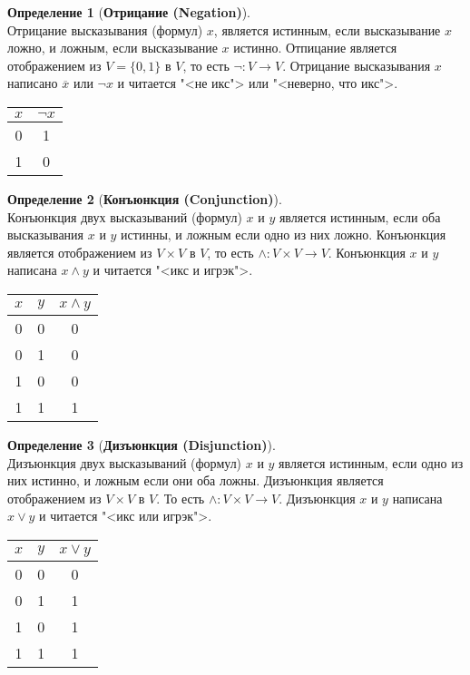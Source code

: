 \documentclass[fleqn,11pt]{article}
\theoremstyle{definition}
\newtheorem{definition}{Определение}
\begin{document}
\begin{definition}[\textbf{Отрицание (Negation)}] ~\\
	Отрицание высказывания (формул) $x$, является истинным, если высказывание $x$ ложно, и ложным, если
	высказывание $x$ истинно. Отпицание является отображением из $V =\{0,1\}$ в $V$, то есть $\neg : V \to V$.
	Отрицание высказывания $x$ написано $\overline{x}$ или $\neg x$ и читается
	"<не икс"> или "<неверно, что икс">.
	\begin{center}
		\begin{tabular}{|c|c|} \hline
			$x$ & $\neg x$ \\ \hline
			0 & 1 \\
			1 & 0 \\
			\hline
		\end{tabular}
	\end{center}
\end{definition}

\begin{definition}[\textbf{Конъюнкция (Conjunction)}] ~\\
	Конъюнкция двух высказываний (формул) $x$ и $y$ является истинным, если оба высказывания $x$ и $y$
	истинны, и ложным если одно из них ложно. Конъюнкция является отображением из $V\times V$ в $V$,
	то есть $\land : V \times V \to V$. Конъюнкция $x$ и $y$ написана $x \land y$ и читается "<икс и игрэк">.
	\begin{center}
		\begin{tabular}{|c|c|c|} \hline
			$x$ & $y$ & $x \land y$  \\ \hline
			0 & 0 & 0 \\
			0 & 1 & 0 \\
			1 & 0 & 0 \\
			1 & 1 & 1 \\
			\hline
		\end{tabular}
	\end{center}
\end{definition}

\begin{definition}[\textbf{Дизъюнкция (Disjunction)}] ~\\
	Дизъюнкция двух высказываний (формул) $x$ и $y$ является истинным, если одно из них истинно, и ложным
	если они оба ложны. Дизъюнкция является отображением из $V \times V$ в $V$. То есть $\land : V \times V \to V$.
	Дизъюнкция $x$ и $y$ написана $x \lor y$ и читается "<икс или игрэк">.
	\begin{center}
		\begin{tabular}{|c|c|c|} \hline
			$x$ & $y$ & $x \lor y$  \\ \hline
			0 & 0 & 0 \\
			0 & 1 & 1 \\
			1 & 0 & 1 \\
			1 & 1 & 1 \\
			\hline
		\end{tabular}
	\end{center}
\end{definition}
\end{document}
